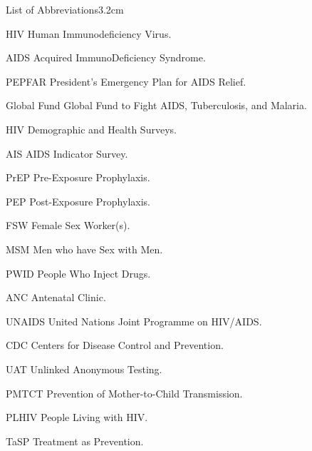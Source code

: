 

\begin{mclistof}{List of Abbreviations}{3.2cm}

\item[HIV] Human Immunodeficiency Virus.
\item[AIDS] Acquired ImmunoDeficiency Syndrome.
\item[PEPFAR] President’s Emergency Plan for AIDS Relief.
\item[Global Fund] Global Fund to Fight AIDS, Tuberculosis, and Malaria.
\item[HIV] Demographic and Health Surveys.
\item[AIS] AIDS Indicator Survey.
\item[PrEP] Pre-Exposure Prophylaxis.
\item[PEP] Post-Exposure Prophylaxis.
\item[FSW] Female Sex Worker(s).
\item[MSM] Men who have Sex with Men.
\item[PWID] People Who Inject Drugs.
\item[ANC] Antenatal Clinic.
\item[UNAIDS] United Nations Joint Programme on HIV/AIDS.
\item[CDC] Centers for Disease Control and Prevention.
\item[UAT] Unlinked Anonymous Testing.
\item[PMTCT] Prevention of Mother-to-Child Transmission.
\item[PLHIV] People Living with HIV.
\item[TaSP] Treatment as Prevention.


\end{mclistof}
